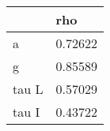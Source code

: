 \begin{tabular}{ll}
& rho \\ 
\hline 
a & 0.72622 \\ 
g & 0.85589 \\ 
tau L & 0.57029 \\ 
tau I & 0.43722 \\ 
\hline 
\end{tabular}